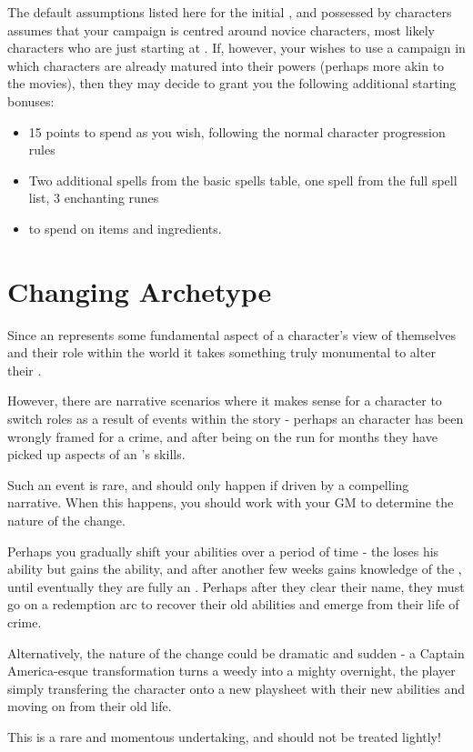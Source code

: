 The default assumptions listed here for the initial ,  and  possessed by characters assumes that your campaign is centred around novice characters, most likely characters who are just starting at . If, however, your  wishes to use a campaign in which characters are already matured into their powers (perhaps more akin to the  movies), then they may decide to grant you the following additional starting bonuses:

\begin{itemize}
	\item 15  points to spend as you wish, following the normal character progression rules
	\item Two additional spells from the basic spells table,  one spell from the full spell list,  3 enchanting runes
	\item {} to spend on items and ingredients.
\end{itemize}

\section{Changing Archetype}

Since an  represents some fundamental aspect of a character's view of themselves and their role within the world it takes something truly monumental to alter their . 

However, there are narrative scenarios where it makes sense for a character to switch roles as a result of events within the story - perhaps an  character has been wrongly framed for a crime, and after being on the run for months they have picked up aspects of an 's skills. 

Such an event is rare, and should only happen if driven by a compelling narrative. When this happens, you should work with your GM to determine the nature of the change. 

Perhaps you gradually shift your abilities over a period of time - the  loses his  ability but gains the  ability, and after another few weeks gains knowledge of the , until eventually they are fully an . Perhaps after they clear their name, they must go on a redemption arc to recover their old abilities and emerge from their life of crime.

Alternatively, the nature of the change could be dramatic and sudden - a Captain America-esque transformation turns a weedy  into a mighty  overnight, the player simply transfering the character onto a new playsheet with their new abilities and moving on from their old life. 

This is a rare and momentous undertaking, and should not be treated lightly!





